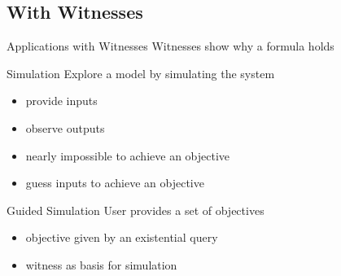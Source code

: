 
\subsection{With Witnesses} 

\begin{frame}{Applications with Witnesses}
  Witnesses show why a formula holds
\end{frame}


\begin{frame}{Simulation}
  Explore a model by simulating the system
  \begin{itemize}
    \item provide inputs 
    \item observe outputs
  \end{itemize}
  
  \begin{itemize}
    \item nearly impossible to achieve an objective
    \item guess inputs to achieve an objective
  \end{itemize}
\end{frame}

\begin{frame}{Guided Simulation}
  User provides a set of objectives
  \begin{itemize}
    \item objective given by an existential query
    \item witness as basis for simulation
  \end{itemize}
\end{frame}

